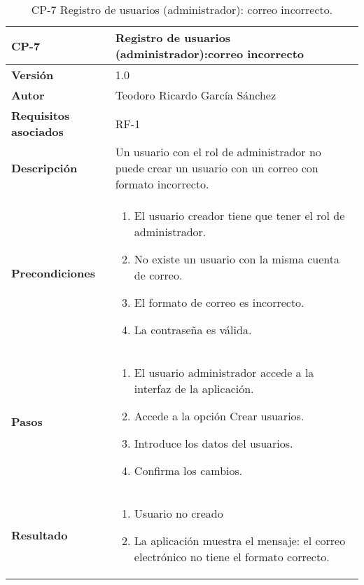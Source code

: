\begin{table}[p]
	\centering
	\begin{tabularx}{\linewidth}{ p{} p{} }
		\toprule
		\textbf{CP-7}    & \textbf{Registro de usuarios (administrador):correo incorrecto}\\
		\toprule
		\textbf{Versión}              & 1.0    \\
		\textbf{Autor}                & Teodoro Ricardo García Sánchez \\
		\textbf{Requisitos asociados} & RF-1 \\
		\textbf{Descripción}          & Un usuario con el rol de administrador no puede crear un usuario con un correo con formato incorrecto. \\
		\textbf{Precondiciones}         & 
		\begin{enumerate}
			\def\labelenumi{\arabic{enumi}.}
			\tightlist
			\item El usuario creador tiene que tener el rol de administrador.
			\item No existe un usuario con la misma cuenta de correo.
			\item El formato de correo es incorrecto.
			\item La contraseña es válida.
		\end{enumerate}\\
		\textbf{Pasos}             &
		\begin{enumerate}
			\def\labelenumi{\arabic{enumi}.}
			\tightlist
			\item El usuario administrador accede a la interfaz de la aplicación.
			\item Accede a la opción Crear usuarios.
			\item Introduce los datos del usuarios.
			\item Confirma los cambios.
		\end{enumerate}\\
		\textbf{Resultado}          & 
		\begin{enumerate}
			\item Usuario no creado
			\item La aplicación muestra el mensaje: el correo electrónico no tiene el formato correcto.
		\end{enumerate}\\
		\bottomrule
	\end{tabularx}
	\caption{CP-7 Registro de usuarios (administrador): correo incorrecto.}
\end{table}

